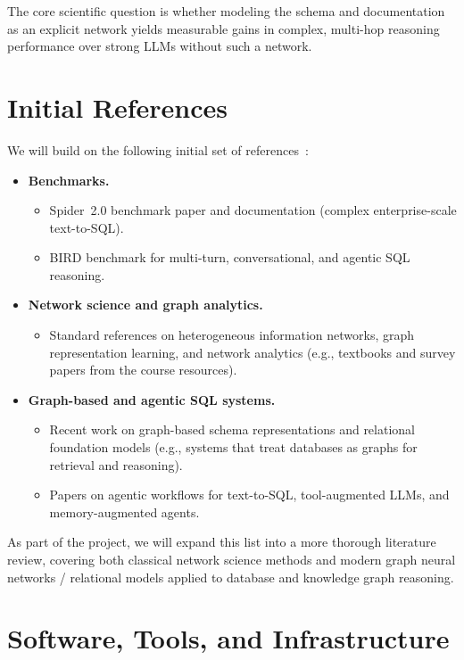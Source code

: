 \documentclass[11pt]{article}
\begin{document}
The core scientific question is whether modeling the schema and documentation as an explicit network yields measurable gains in complex, multi-hop reasoning performance over strong LLMs without such a network.

\section{Initial References}

We will build on the following initial set of references~\cite{yu2024spider2,li2024bird,sun2013survey,ji2022survey,schlichtkrull2018rgcn}:

\begin{itemize}[leftmargin=*]
  \item \textbf{Benchmarks.}
  \begin{itemize}
    \item Spider~2.0 benchmark paper and documentation (complex enterprise-scale text-to-SQL).
    \item BIRD benchmark for multi-turn, conversational, and agentic SQL reasoning.
  \end{itemize}
  \item \textbf{Network science and graph analytics.}
  \begin{itemize}
    \item Standard references on heterogeneous information networks, graph representation learning, and network analytics (e.g., textbooks and survey papers from the course resources).
  \end{itemize}
  \item \textbf{Graph-based and agentic SQL systems.}
  \begin{itemize}
    \item Recent work on graph-based schema representations and relational foundation models (e.g., systems that treat databases as graphs for retrieval and reasoning).
    \item Papers on agentic workflows for text-to-SQL, tool-augmented LLMs, and memory-augmented agents.
  \end{itemize}
\end{itemize}

As part of the project, we will expand this list into a more thorough literature review, covering both classical network science methods and modern graph neural networks / relational models applied to database and knowledge graph reasoning.

\section{Software, Tools, and Infrastructure}
\end{document}
